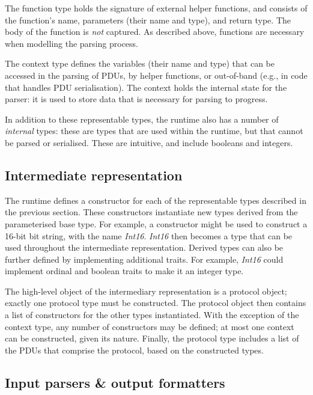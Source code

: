 \documentclass[10pt,sigconf]{acmart}
\begin{document}
The function type holds the signature of external helper functions, and consists of the
function's name, parameters (their name and type), and return type. The body of the
function is \emph{not} captured. As described above, functions are necessary when
modelling the parsing process.

The context type defines the variables (their name and type) that can be accessed in the
parsing of PDUs, by helper functions, or out-of-band (e.g., in code that handles PDU
serialisation). The context holds the internal state for the parser: it is used to store
data that is necessary for parsing to progress.

In addition to these representable types, the runtime also has a number of \emph{internal}
types: these are types that are used within the runtime, but that cannot be parsed or
serialised. These are intuitive, and include booleans and integers.

\subsection{Intermediate representation}
\label{sec:gpl-ir}

The runtime defines a constructor for each of the representable types described in the
previous section. These constructors instantiate new types derived from the parameterised
base type. For example, a constructor might be used to construct a 16-bit bit string, with
the name \emph{Int16}. \emph{Int16} then becomes a type that can be used throughout the
intermediate representation. Derived types can also be further defined by implementing
additional traits. For example, \emph{Int16} could implement ordinal and boolean traits to
make it an integer type.

The high-level object of the intermediary representation is a protocol object; exactly
one protocol type must be constructed. The protocol object then contains a list of
constructors for the other types instantiated. With the exception of the context type,
any number of constructors may be defined; at most one context can be constructed, given
its nature. Finally, the protocol type includes a list of the PDUs that comprise the
protocol, based on the constructed types.

\subsection{Input parsers \& output formatters}
\label{sec:gpl-formats}
\end{document}
